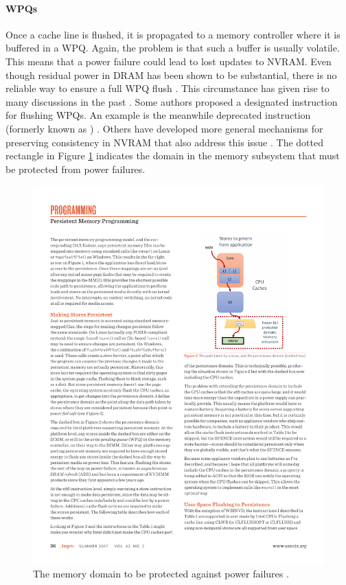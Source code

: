 \paragraph{\acp{WPQ}}

Once a cache line is flushed, it is propagated to a memory controller where it
is buffered in a \ac{WPQ}. Again, the problem is that such a buffer is usually
volatile. This means that a power failure could lead to lost updates to
\ac{NVRAM}. Even though residual power in \ac{DRAM} has been shown to be
substantial, there is no reliable way to ensure a full \ac{WPQ} flush
\cite{halderman2008lest}. This circumstance has given rise to many discussions
in the past \cite{condit2009better, dulloor2014system, kolli2016high}. Some
authors proposed a designated instruction for flushing \acp{WPQ}. An example is
the meanwhile deprecated  instruction (formerly known as
) \cite{dulloor2014system, oukid2015instant,
volos2017whisper}. Others have developed more general mechanisms for preserving
consistency in \ac{NVRAM} that also address this issue \cite{condit2009better,
pelley2014memory}. The dotted rectangle in Figure \ref{fig:wpq} indicates the
domain in the memory subsystem that must be protected from power failures.

\begin{figure}[h!]
    \centering
    \includegraphics{figures/adr-example.pdf}
    \captionsetup{justification=centering}
    \caption{The memory domain to be protected against power failures \cite{rudoff2017persistent}.}
    \label{fig:wpq}
\end{figure}

